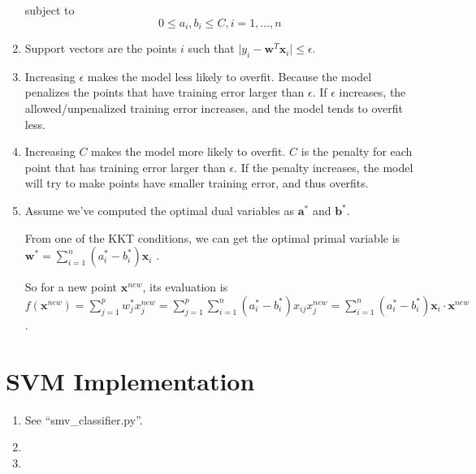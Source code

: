\documentclass[paper=letter, fontsize=12pt]{article}
\begin{document}
\begin{enumerate}[label=(\alph*)]
	subject to 
	$$
	0 \leq a_i, b_i \leq C, i = 1, \dots, n
	$$
	
	\item
	Support vectors are the points $i$ such that $\vert y_i - \mathbf{w}^T \mathbf{x}_i \vert \leq \epsilon$.
	
	\item
	Increasing $\epsilon$ makes the model less likely to overfit. Because the model penalizes the points that have training error larger than $\epsilon$. If $\epsilon$ increases, the allowed/unpenalized training error increases, and the model tends to overfit less.
	
	\item
	Increasing $C$ makes the model more likely to overfit. $C$ is the penalty for each point that has training error larger than $\epsilon$. If the penalty increases, the model will try to make points have smaller training error, and thus overfits.
	
	\item    
	Assume we've computed the optimal dual variables as $\mathbf{a}^*$ and $\mathbf{b}^*$.
	
	From one of the KKT conditions, we can get the optimal primal variable is $\mathbf{w}^* = \sum_{i = 1}^{n} (a_i^* - b_i^*) \mathbf{x}_i$ .
	
	So for a new point $\mathbf{x}^{new}$, its evaluation is $f(\mathbf{x}^{new}) = \sum_{j = 1}^{p} w_j^* x_j^{new} = \sum_{j = 1}^{p} \sum_{i = 1}^{n} (a_i^* - b_i^*) x_{ij} x_j^{new} = \sum_{i = 1}^{n} (a_i^* - b_i^*) \mathbf{x}_i \cdot \mathbf{x}^{new }$.
\end{enumerate}

\section{SVM Implementation}
\begin{enumerate}[label=(\alph*)]
	\item See ``smv\_classifier.py''.
	
	\item 
	
	\item
\end{enumerate}
\end{document}
